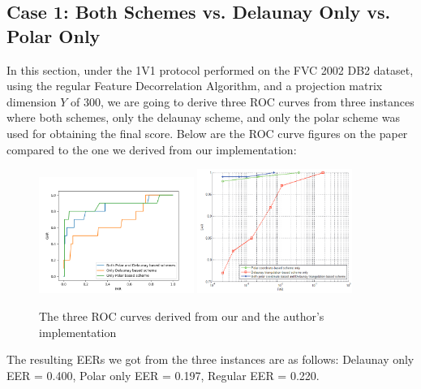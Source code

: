 \documentclass[fyp]{socreport}
\begin{document}
\subsection{Case 1: Both Schemes vs. Delaunay Only vs. Polar Only}
In this section, under the 1V1 protocol performed on the FVC 2002 DB2 dataset, using the regular Feature Decorrelation Algorithm, and a projection matrix dimension $Y$ of 300, we are going to derive  three ROC curves from three instances where both schemes, only the delaunay scheme, and only the polar scheme was used for obtaining the final score. Below are the ROC curve figures on the paper compared to the one we derived from our implementation:

\begin{figure}[H]
	\centering
	\includegraphics[width=0.45\textwidth]
	{3ROC}
	\includegraphics[width=0.45\textwidth]
	{3ROC2}
	\caption{The three ROC curves derived from our and the author's implementation}
\end{figure}

The resulting EERs we got from the three instances are as follows: Delaunay only EER = 0.400, Polar only EER = 0.197, Regular EER = 0.220.
\end{document}

